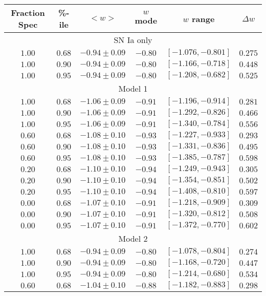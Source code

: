 \documentclass[preprint]{elsarticle}
\begin{document}
\begin{table}
\centering
\begin{tabular}{|c|c|cccc|}
\hline
Fraction Spec&\%-ile &$<w>$ & $w$ mode  &$w$ range & $\Delta w$\\ \hline
\multicolumn{6}{|c|}{SN Ia only}\\ \hline
$1.00$& $0.68$ &$-0.94 \pm 0.09$ &$-0.80$ & $[-1.076, -0.801]$ & $0.275$ \\
$1.00$& $0.90$ &$-0.94 \pm 0.09$ &$-0.80$ & $[-1.166, -0.718]$ & $0.448$ \\
$1.00$& $0.95$ &$-0.94 \pm 0.09$ &$-0.80$ & $[-1.208, -0.682]$ & $0.525$ \\
 \hline
\multicolumn{6}{|c|}{Model 1}\\ \hline
$1.00$ &$0.68$ &$-1.06 \pm 0.09$ &$-0.91$ & $[-1.196, -0.914]$ & $0.281$ \\
$1.00$ &$0.90$ &$-1.06 \pm 0.09$ &$-0.91$ & $[-1.292, -0.826]$ & $0.466$ \\
$1.00$ &$0.95$ &$-1.06 \pm 0.09$ &$-0.91$ & $[-1.340, -0.784]$ & $0.556$ \\
$0.60$ &$0.68$ &$-1.08 \pm 0.10$ &$-0.93$ & $[-1.227, -0.933]$ & $0.293$ \\
$0.60$ &$0.90$ &$-1.08 \pm 0.10$ &$-0.93$ & $[-1.331, -0.836]$ & $0.495$ \\
$0.60$ &$0.95$ &$-1.08 \pm 0.10$ &$-0.93$ & $[-1.385, -0.787]$ & $0.598$ \\
$0.20$ &$0.68$ &$-1.10 \pm 0.10$ &$-0.94$ & $[-1.249, -0.943]$ & $0.305$ \\
$0.20$ &$0.90$ &$-1.10 \pm 0.10$ &$-0.94$ & $[-1.354, -0.851]$ & $0.502$ \\
$0.20$ &$0.95$ &$-1.10 \pm 0.10$ &$-0.94$ & $[-1.408, -0.810]$ & $0.597$ \\
$0.00$ &$0.68$ &$-1.07 \pm 0.10$ &$-0.91$ & $[-1.218, -0.909]$ & $0.309$ \\
$0.00$ &$0.90$ &$-1.07 \pm 0.10$ &$-0.91$ & $[-1.320, -0.812]$ & $0.508$ \\
$0.00$ &$0.95$ &$-1.07 \pm 0.10$ &$-0.91$ & $[-1.372, -0.770]$ & $0.602$ \\
 \hline
\multicolumn{6}{|c|}{Model 2}\\ \hline
$1.00$ &$0.68$ &$-0.94 \pm 0.09$ &$-0.80$ & $[-1.078, -0.804]$ & $0.274$ \\
$1.00$ &$0.90$ &$-0.94 \pm 0.09$ &$-0.80$ & $[-1.168, -0.720]$ & $0.447$ \\
$1.00$ &$0.95$ &$-0.94 \pm 0.09$ &$-0.80$ & $[-1.214, -0.680]$ & $0.534$ \\
$0.60$ &$0.68$ &$-1.04 \pm 0.10$ &$-0.88$ & $[-1.182, -0.883]$ & $0.298$ \\

\end{tabular}
\end{table}
\end{document}
